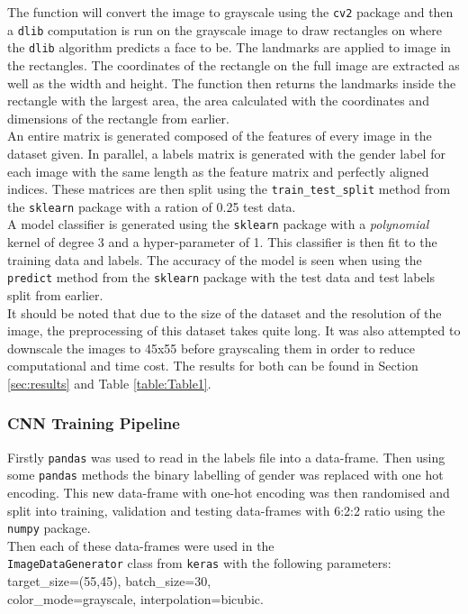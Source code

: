 \documentclass{article}
\begin{document}
	 The function will convert the image to grayscale using the \verb|cv2| package and then a \verb|dlib| computation is run on the grayscale image to draw rectangles on where the \verb|dlib| algorithm predicts a face to be. The landmarks are applied to image in the rectangles. The coordinates of the rectangle on the full image are extracted as well as the width and height. The function then returns the landmarks inside the rectangle with the largest area, the area calculated with the coordinates and dimensions of the rectangle from earlier.\\
	 
	 An entire matrix is generated composed of the features of every image in the dataset given. In parallel, a labels matrix is generated with the gender label for each image with the same length as the feature matrix and perfectly aligned indices. These matrices are then split using the \verb|train_test_split| method from the \verb|sklearn| package with a ration of 0.25 test data.\\
	 
	 A model classifier is generated using the \verb|sklearn| package with a \textit{polynomial} kernel of degree 3 and a hyper-parameter of 1. This classifier is then fit to the training data and labels. The accuracy of the model is seen when using the \verb|predict| method from the \verb|sklearn| package with the test data and test labels split from earlier.\\
	 
	 It should be noted that due to the size of the dataset and the resolution of the image, the preprocessing of this dataset takes quite long. It was also attempted to downscale the images to 45x55 before grayscaling them in order to reduce computational and time cost. The results for both can be found in Section \ref{sec:results} and Table \ref{table:Table1}.

 	\subsubsection{CNN Training Pipeline}
 	Firstly \verb|pandas| was used to read in the labels file into a data-frame. Then using some \verb|pandas| methods the binary labelling of gender was replaced with one hot encoding. This new data-frame with one-hot encoding was then randomised and split into training, validation and testing data-frames with 6:2:2 ratio using the \verb|numpy| package.\\
 	
 	Then each of these data-frames were used in the \\ \verb|ImageDataGenerator| class from \verb|keras| with the following parameters: target\_size=(55,45), batch\_size=30,\\ color\_mode=grayscale, interpolation=bicubic.\\
 	
\end{document}
